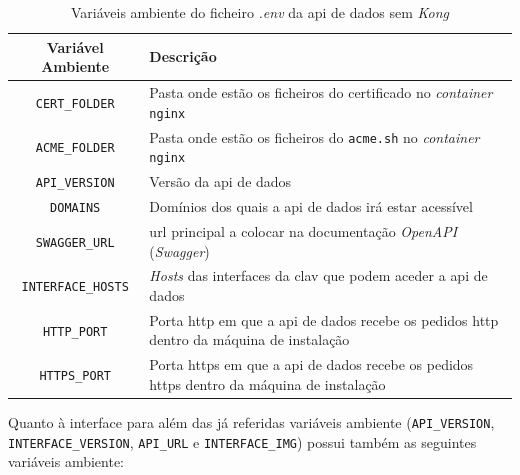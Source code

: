 \begin{table}[H]
\fontsize{10}{12}\selectfont
\begin{tabularx}{\textwidth}{|c|X|}
    \hline
    Variável Ambiente & Descrição \\ \hline
    \texttt{CERT\_FOLDER} & Pasta onde estão os ficheiros do certificado no \textit{container} \texttt{nginx} \\ \hline
    \texttt{ACME\_FOLDER} & Pasta onde estão os ficheiros do \texttt{acme.sh} no \textit{container} \texttt{nginx} \\ \hline
    \texttt{API\_VERSION} & Versão da \acrshort{api} de dados \\ \hline
    \texttt{DOMAINS} & Domínios dos quais a \acrshort{api} de dados irá estar acessível \\ \hline
    \texttt{SWAGGER\_URL} & \acrshort{url} principal a colocar na documentação \textit{OpenAPI} (\textit{Swagger}) \\ \hline
    \texttt{INTERFACE\_HOSTS} & \textit{Hosts} das interfaces da \acrshort{clav} que podem aceder a \acrshort{api} de dados \\ \hline
    \texttt{HTTP\_PORT} & Porta \acrshort{http} em que a \acrshort{api} de dados recebe os pedidos \acrshort{http} dentro da máquina de instalação \\ \hline
    \texttt{HTTPS\_PORT} & Porta \acrshort{https} em que a \acrshort{api} de dados recebe os pedidos \acrshort{https} dentro da máquina de instalação \\ \hline
\end{tabularx}
\caption{Variáveis ambiente do ficheiro \textit{.env} da \acrshort{api} de dados sem \textit{Kong}}
\end{table}

Quanto à interface para além das já referidas variáveis ambiente (\texttt{API\_VERSION}, \texttt{INTERFACE\_VERSION}, \texttt{API\_URL} e \texttt{INTERFACE\_IMG}) possui também as seguintes variáveis ambiente:

